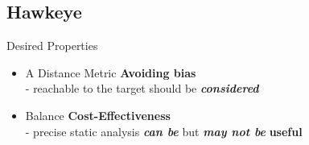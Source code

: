 \documentclass[10pt,aspectratio=43]{beamer}
\begin{document}
\subsection{Hawkeye}
\begin{frame}{Desired Properties}
    \begin{itemize}
        \item  A Distance Metric \textbf{\textcolor{deepred}{Avoiding bias}} \\
            - \textbf{} reachable to the target should be \textbf{\textit{considered}}
        \item  Balance \textbf{\textcolor{deepred}{Cost-Effectiveness}} \\
            - precise static analysis \textbf{\textit{can be}} \textbf{} but \textbf{\textit{may not be}} \textbf{\textcolor{deepred}{useful}}
    \end{itemize} 
\end{frame}
\end{document}
